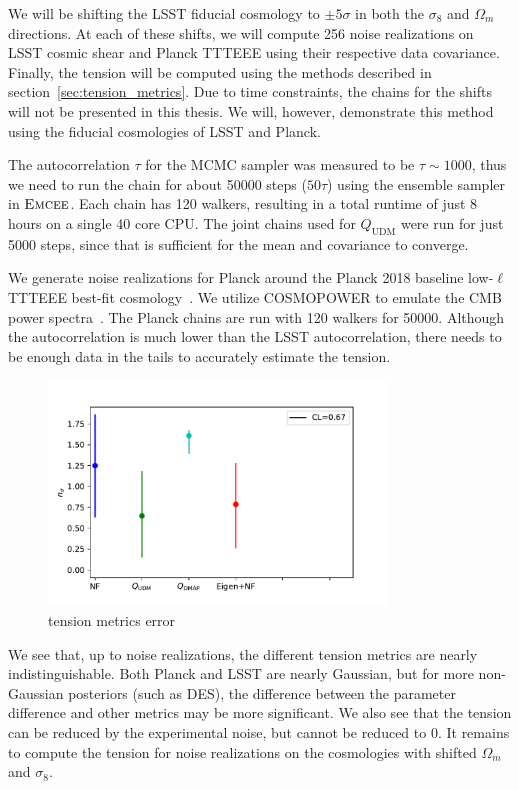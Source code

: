 We will be shifting the LSST fiducial cosmology to $\pm5\sigma$ in both the $\sigma_8$ and $\Omega_m$ directions. At each of these shifts, we will compute 256 noise realizations on LSST cosmic shear and Planck TTTEEE using their respective data covariance. Finally, the tension will be computed using the methods described in section~\ref{sec:tension_metrics}. Due to time constraints, the chains for the shifts will not be presented in this thesis. We will, however, demonstrate this method using the fiducial cosmologies of LSST and Planck.

The autocorrelation $\tau$ for the MCMC sampler was measured to be $\tau\sim1000$, thus we need to run the chain for about 50000 steps ($50\tau$) using the ensemble sampler in $\textsc{Emcee}$. Each chain has 120 walkers, resulting in a total runtime of just 8 hours on a single 40 core CPU. The joint chains used for $Q_{\mathrm{UDM}}$ were run for just 5000 steps, since that is sufficient for the mean and covariance to converge. 

We generate noise realizations for Planck around the Planck 2018 baseline low-$\ell$ TTTEEE best-fit cosmology~\cite{noauthor_planck_2018}. We utilize \textsc{COSMOPOWER} to emulate the CMB power spectra~\cite{mancini_cosmopower_2022,prince_data_2019}. The Planck chains are run with 120 walkers for 50000. Although the autocorrelation is much lower than the LSST autocorrelation, there needs to be enough data in the tails to accurately estimate the tension.
\begin{figure}[tb]
	\centering
	\includegraphics[width=0.8\textwidth]{plots/metrics_new.pdf}
	\caption{tension metrics error}
	\label{fig:tension_metrics_error}
\end{figure}

We see that, up to noise realizations, the different tension metrics are nearly indistinguishable. Both Planck and LSST are nearly Gaussian, but for more non-Gaussian posteriors (such as DES), the difference between the parameter difference and other metrics may be more significant. We also see that the tension can be reduced by the experimental noise, but cannot be reduced to 0. It remains to compute the tension for noise realizations on the cosmologies with shifted $\Omega_m$ and $\sigma_8$.

